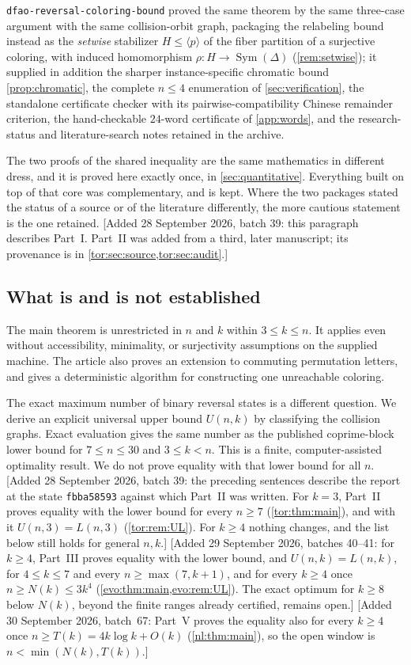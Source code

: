 \documentclass[11pt,a4paper]{article}
\numberwithin{equation}{section}
\theoremstyle{definition}
\theoremstyle{remark}
\newcommand{\D}{\Delta}
\newcommand{\Sym}{\operatorname{Sym}}
\begin{document}
\texttt{dfao-reversal-coloring-bound} proved the same theorem by the same
three-case argument with the same collision-orbit graph, packaging the
relabeling bound instead as the \emph{setwise} stabilizer $H\le\langle
p\rangle$ of the fiber partition of a surjective coloring, with induced
homomorphism $\rho:H\to\Sym(\D)$ (\cref{rem:setwise}); it supplied in
addition the sharper instance-specific chromatic bound
\cref{prop:chromatic}, the complete $n\le4$ enumeration of
\cref{sec:verification}, the standalone certificate checker with its
pairwise-compatibility Chinese remainder criterion, the hand-checkable
$24$-word certificate of \cref{app:words}, and the research-status and
literature-search notes retained in the archive.

The two proofs of the shared inequality are the same mathematics in
different dress, and it is proved here exactly once, in
\cref{sec:quantitative}. Everything built on top of that core was
complementary, and is kept. Where the two packages stated the status of a
source or of the literature differently, the more cautious statement is the
one retained.
[Added 28 September 2026, batch 39: this paragraph describes Part~I. Part~II
was added from a third, later manuscript; its provenance is in
\cref{tor:sec:source,tor:sec:audit}.]

\subsection{What is and is not established}

The main theorem is unrestricted in $n$ and $k$ within $3\le k\le n$.
It applies even without accessibility, minimality, or surjectivity
assumptions on the supplied machine. The article also proves an extension to
commuting permutation letters, and gives a deterministic algorithm for
constructing one unreachable coloring.

The exact maximum number of binary reversal states is a different question.
We derive an explicit universal upper bound $U(n,k)$ by classifying the
collision graphs. Exact evaluation gives the same number as the published
coprime-block lower bound for $7\le n\le30$ and $3\le k<n$. This is a
finite, computer-assisted optimality result. We do not prove equality with
that lower bound for all $n$.
[Added 28 September 2026, batch 39: the preceding sentences describe the
report at the state \texttt{fbba58593} against which Part~II was written. For
$k=3$, Part~II proves equality with the lower bound for every $n\ge7$
(\cref{tor:thm:main}), and with it $U(n,3)=L(n,3)$ (\cref{tor:rem:UL}). For
$k\ge4$ nothing changes, and the list below still holds for general $n,k$.]
[Added 29 September 2026, batches 40--41: for $k\ge4$, Part~III proves equality with the lower
bound, and $U(n,k)=L(n,k)$, for $4\le k\le7$ and every $n\ge\max(7,k+1)$, and
for every $k\ge4$ once $n\ge N(k)\le3k^4$ (\cref{evo:thm:main,evo:rem:UL}).
The exact optimum for $k\ge8$ below $N(k)$, beyond the finite ranges already
certified, remains open.]
[Added 30 September 2026, batch~67: Part~V proves the equality also for every $k\ge4$ once
$n\ge T(k)=4k\log k+O(k)$ (\cref{nl:thm:main}), so the open window is
$n<\min(N(k),T(k))$.]
\end{document}
